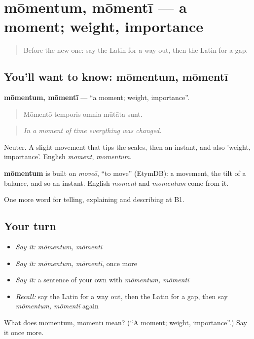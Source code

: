 \section[mōmentum, mōmentī]{mōmentum, mōmentī — a moment; weight, importance}

\label{lesson:LA-C296-momentum}



\begin{quote}
Before the new one: say the Latin for a way out, then the Latin for a gap.
\end{quote}

\subsection*{You'll want to know: mōmentum, mōmentī}
\textbf{mōmentum, mōmentī} — \textquotedblleft{}a moment; weight, importance\textquotedblright{}.

\begin{quote}
Mōmentō temporis omnia mūtāta sunt.
\end{quote}

\begin{quote}
\emph{In a moment of time everything was changed.}
\end{quote}

Neuter. A slight movement that tips the scales, then an instant, and also 'weight, importance'. English \emph{moment}, \emph{momentum}.

\begin{cousinweb}
\textbf{mōmentum} is built on \emph{moveō}, \textquotedblleft{}to move\textquotedblright{} (EtymDB): a movement, the tilt of a balance, and so an instant. English \emph{moment} and \emph{momentum} come from it.
\end{cousinweb}

\begin{grammarlens}[title={What you've built}]
One more word for telling, explaining and describing at B1.
\end{grammarlens}

\subsection*{Your turn}
\begin{itemize}
\raggedright
  \item \emph{Say it:} \emph{mōmentum, mōmentī}
  \item \emph{Say it:} \emph{mōmentum, mōmentī}, once more
  \item \emph{Say it:} a sentence of your own with \emph{mōmentum, mōmentī}
  \item \emph{Recall:} say the Latin for a way out, then the Latin for a gap, then say \emph{mōmentum, mōmentī} again
\end{itemize}

\begin{tcolorbox}[breakable,colback=teal!4,colframe=teal!35!black,title={Before you move on}]
What does mōmentum, mōmentī mean? (\textquotedblleft{}A moment; weight, importance\textquotedblright{}.) Say it once more.
\end{tcolorbox}
